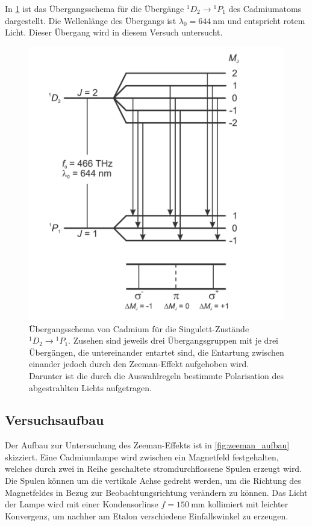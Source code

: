 In \cref{fig:zeeman_übergänge} ist das Übergangsschema für die Übergänge ${}^1D_2\rightarrow {}^1P_1$
des Cadmiumatoms dargestellt. Die Wellenlänge des Übergangs ist $\lambda_0 = \SI{644}{\nano\meter}$
und entspricht rotem Licht. Dieser Übergang wird in diesem Versuch untersucht.

\begin{figure}
    \centering
    \includegraphics[width=0.6\linewidth]{../figs/zeeman_übergänge}
    \caption{Übergangsschema von Cadmium für die Singulett-Zustände ${}^1D_2\rightarrow {}^1P_1$. 
        Zusehen sind jeweils drei Übergangsgruppen mit je drei Übergängen, die untereinander
        entartet sind, die Entartung zwischen einander jedoch durch den Zeeman-Effekt aufgehoben wird. Darunter 
        ist die durch die Auswahlregeln bestimmte Polarisation des abgestrahlten Lichts aufgetragen. 
        \cite{zeeman_handblatt}}
    \label{fig:zeeman_übergänge}
\end{figure}

\subsection{Versuchsaufbau}
Der Aufbau zur Untersuchung des Zeeman-Effekts ist in \cref{fig:zeeman_aufbau} skizziert. Eine 
Cadmiumlampe wird zwischen ein Magnetfeld festgehalten, welches durch zwei in Reihe 
geschaltete stromdurchflossene Spulen erzeugt wird. Die Spulen können 
um die vertikale Achse gedreht werden, um die Richtung 
des Magnetfeldes in Bezug zur Beobachtungsrichtung verändern zu können. 
Das Licht der Lampe wird mit einer Kondensorlinse 
$f=\SI{150}{\mm}$ kollimiert mit leichter Konvergenz, um nachher am Etalon verschiedene Einfallswinkel zu 
erzeugen. 

